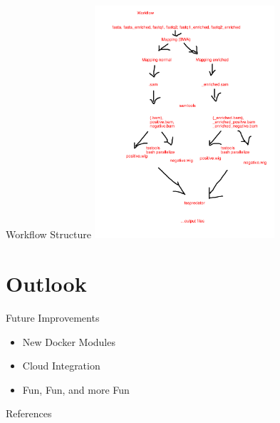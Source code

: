 \documentclass{beamer} %
\begin{document}
\begin{frame}{Workflow Structure}
  \centering
  \includegraphics[width=0.5\textwidth]{../paper/workflow_sketch.pdf}
\end{frame}

\section{Outlook}

\begin{frame}{Future Improvements}
 \begin{itemize}
  \item New Docker Modules
  \item Cloud Integration
  \item Fun, Fun, and more Fun
 \end{itemize}
\end{frame}

\begin{frame}[allowframebreaks]{References}
 
 
\end{frame}
\end{document}
